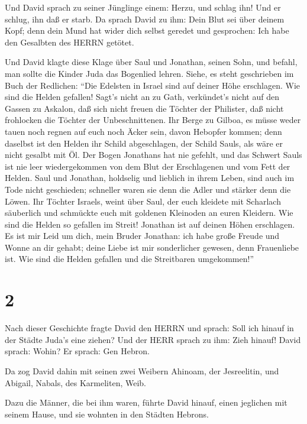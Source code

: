  Und David sprach zu seiner Jünglinge einem: Herzu, und
schlag ihn! Und er schlug, ihn daß er starb.  Da sprach
David zu ihm: Dein Blut sei über deinem Kopf; denn dein Mund hat wider
dich selbst geredet und gesprochen: Ich habe den Gesalbten des HERRN
getötet.

 Und David klagte diese Klage über Saul und Jonathan,
seinen Sohn,  und befahl, man sollte die Kinder Juda das
Bogenlied lehren. Siehe, es steht geschrieben im Buch der Redlichen:
 ``Die Edelsten in Israel sind auf deiner Höhe erschlagen.
Wie sind die Helden gefallen!  Sagt's nicht an zu Gath,
verkündet's nicht auf den Gassen zu Askalon, daß sich nicht freuen die
Töchter der Philister, daß nicht frohlocken die Töchter der
Unbeschnittenen.  Ihr Berge zu Gilboa, es müsse weder tauen
noch regnen auf euch noch Äcker sein, davon Hebopfer kommen; denn
daselbst ist den Helden ihr Schild abgeschlagen, der Schild Sauls, als
wäre er nicht gesalbt mit Öl.  Der Bogen Jonathans hat nie
gefehlt, und das Schwert Sauls ist nie leer wiedergekommen von dem Blut
der Erschlagenen und vom Fett der Helden.  Saul und
Jonathan, holdselig und lieblich in ihrem Leben, sind auch im Tode nicht
geschieden; schneller waren sie denn die Adler und stärker denn die
Löwen.  Ihr Töchter Israels, weint über Saul, der euch
kleidete mit Scharlach säuberlich und schmückte euch mit goldenen
Kleinoden an euren Kleidern.  Wie sind die Helden so
gefallen im Streit! Jonathan ist auf deinen Höhen erschlagen.
 Es ist mir Leid um dich, mein Bruder Jonathan: ich habe
große Freude und Wonne an dir gehabt; deine Liebe ist mir sonderlicher
gewesen, denn Frauenliebe ist.  Wie sind die Helden
gefallen und die Streitbaren umgekommen!''

\hypertarget{section-1}{%
\section{2}\label{section-1}}

 Nach dieser Geschichte fragte David den HERRN und sprach:
Soll ich hinauf in der Städte Juda's eine ziehen? Und der HERR sprach zu
ihm: Zieh hinauf! David sprach: Wohin? Er sprach: Gen Hebron.

 Da zog David dahin mit seinen zwei Weibern Ahinoam, der
Jesreelitin, und Abigail, Nabals, des Karmeliten, Weib.

 Dazu die Männer, die bei ihm waren, führte David hinauf,
einen jeglichen mit seinem Hause, und sie wohnten in den Städten
Hebrons.

